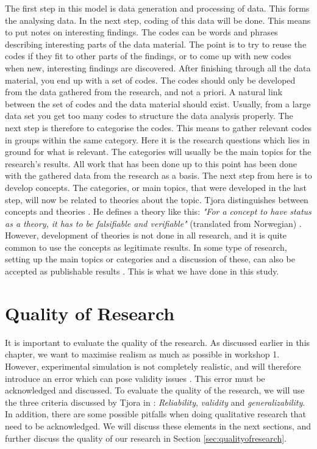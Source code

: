 The first step in this model is data generation and processing of data. This forms the analysing data. In the next step, coding of this data will be done. This means to put notes on interesting findings. The codes can be words and phrases describing interesting parts of the data material. The point is to try to reuse the codes if they fit to other parts of the findings, or to come up with new codes when new, interesting findings are discovered. After finishing through all the data material, you end up with a set of codes. The codes should only be developed from the data gathered from the research, and not a priori. A natural link between the set of codes and the data material should exist. Usually, from a large data set you get too many codes to structure the data analysis properly. The next step is therefore to categorise the codes. This means to gather relevant codes in groups within the same category. Here it is the research questions which lies in ground for what is relevant. The categories will usually be the main topics for the research's results. All work that has been done up to this point has been done with the gathered data from the research as a basis. The next step from here is to develop concepts. The categories, or main topics, that were developed in the last step, will now be related to theories about the topic. Tjora distinguishes between concepts and theories \cite{tjora}. He defines a theory like this: \emph{"For a concept to have status as a theory, it has to be falsifiable and verifiable"} (translated from Norwegian) \cite{tjora}. However, development of theories is not done in all research, and it is quite common to use the concepts as legitimate results. In some type of research, setting up the main topics or categories and a discussion of these, can also be accepted as publishable results \cite{tjora}. This is what we have done in this study. 

\section{Quality of Research}
\label{sec:qualityresearch}
It is important to evaluate the quality of the research. As discussed earlier in this chapter, we want to maximise realism as much as possible in workshop 1. However, experimental simulation is not completely realistic, and will therefore introduce an error which can pose validity issues \cite{alsos}.  This error must be acknowledged and discussed. To evaluate the quality of the research, we will use the three criteria discussed by Tjora in \cite{tjora}:  \emph{Reliability}, \emph{validity} and \emph{generalizability}. In addition, there are some possible pitfalls when doing qualitative research that need to be acknowledged. We will discuss these elements in the next sections, and further discuss the quality of our research in Section \ref{sec:qualityofresearch}.

